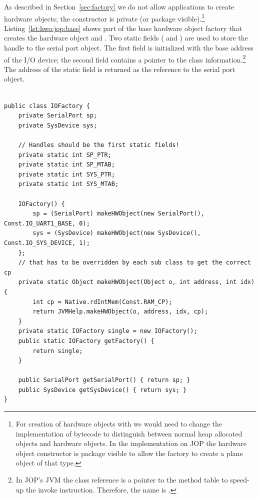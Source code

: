 As described in Section~\ref{sec:factory} we do not allow
applications to create hardware objects; the constructor is private
(or package visible).\footnote{For creation of hardware objects with
 we would need to change the implementation of bytecode
 to distinguish between normal heap allocated objects
and hardware objects. In the implementation on JOP the hardware
object constructor is package visible to allow the factory to create
a plane object of that type.} Listing~\ref{lst:hwo:jop:base} shows
part of the base hardware object factory that creates the hardware
object  and . Two static fields
( and ) are used to store the handle to
the serial port object. The first field is initialized with the base
address of the I/O device; the second field contains a pointer to the
class information.\footnote{In JOP's JVM the class reference is a
pointer to the method table to speed-up the invoke instruction.
Therefore, the name is .} The address of the
static field  is returned as the reference to the
serial port object.

\begin{lstlisting}[float=t,caption={Simplified version of the JOP base factory},
label=lst:hwo:jop:base]

public class IOFactory {
    private SerialPort sp;
    private SysDevice sys;

    // Handles should be the first static fields!
    private static int SP_PTR;
    private static int SP_MTAB;
    private static int SYS_PTR;
    private static int SYS_MTAB;

    IOFactory() {
        sp = (SerialPort) makeHWObject(new SerialPort(), Const.IO_UART1_BASE, 0);
        sys = (SysDevice) makeHWObject(new SysDevice(), Const.IO_SYS_DEVICE, 1);
    };
    // that has to be overridden by each sub class to get the correct cp
    private static Object makeHWObject(Object o, int address, int idx) {
        int cp = Native.rdIntMem(Const.RAM_CP);
        return JVMHelp.makeHWObject(o, address, idx, cp);
    }
    private static IOFactory single = new IOFactory();
    public static IOFactory getFactory() {
        return single;
    }

    public SerialPort getSerialPort() { return sp; }
    public SysDevice getSysDevice() { return sys; }
}
\end{lstlisting}

